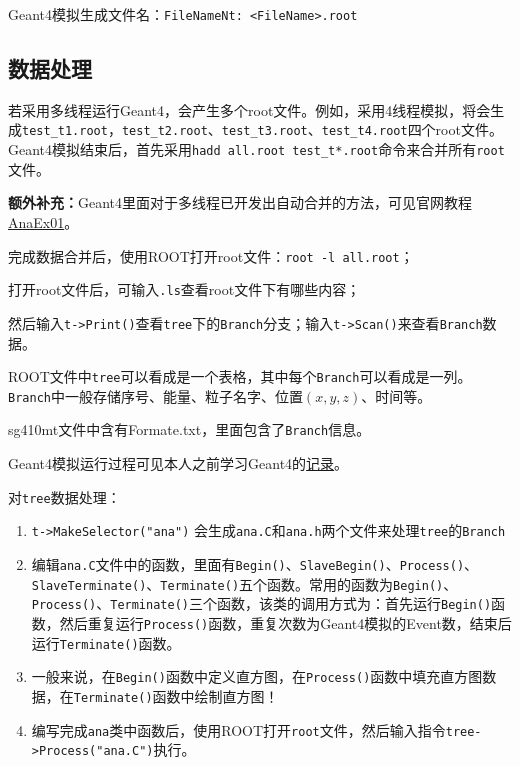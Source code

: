 \documentclass{article}
\begin{document}
Geant4模拟生成文件名：\texttt{FileNameNt: <FileName>.root}

\subsection{数据处理}
若采用多线程运行Geant4，会产生多个root文件。例如，采用4线程模拟，将会生成\texttt{test\_t1.root}，\texttt{test\_t2.root}、\texttt{test\_t3.root}、\texttt{test\_t4.root}四个root文件。Geant4模拟结束后，首先采用\texttt{hadd all.root test\_t*.root}命令来合并所有\texttt{root}文件。

\textbf{额外补充：}Geant4里面对于多线程已开发出自动合并的方法，可见官网教程\href{https://github.com/Geant4/geant4/blob/3dfcdb544e19888c7a5979720ae09596207436f2/examples/extended/analysis/AnaEx01/src/HistoManager.cc#L60}{AnaEx01}。

完成数据合并后，使用ROOT打开root文件：\texttt{root -l all.root}；

打开root文件后，可输入\texttt{.ls}查看root文件下有哪些内容；

然后输入\texttt{t->Print()}查看\texttt{tree}下的\texttt{Branch}分支；输入\texttt{t->Scan()}来查看\texttt{Branch}数据。

ROOT文件中\texttt{tree}可以看成是一个表格，其中每个\texttt{Branch}可以看成是一列。\texttt{Branch}中一般存储序号、能量、粒子名字、位置$ (x, y, z) $、时间等。

sg410mt文件中含有Formate.txt，里面包含了\texttt{Branch}信息。

Geant4模拟运行过程可见本人之前学习Geant4的\href{https://blog.csdn.net/sinat_33249803/article/details/116067709?spm=1001.2014.3001.5501}{记录}。


对\texttt{tree}数据处理：
\begin{enumerate}
    \item \texttt{t->MakeSelector("ana")} 会生成\texttt{ana.C}和\texttt{ana.h}两个文件来处理\texttt{tree}的\texttt{Branch}
    \item 编辑\texttt{ana.C}文件中的函数，里面有\texttt{Begin()}、\texttt{SlaveBegin()}、\texttt{Process()}、\texttt{SlaveTerminate()}、\texttt{Terminate()}五个函数。常用的函数为\texttt{Begin()}、\texttt{Process()}、\texttt{Terminate()}三个函数，该类的调用方式为：首先运行\texttt{Begin()}函数，然后重复运行\texttt{Process()}函数，重复次数为Geant4模拟的Event数，结束后运行\texttt{Terminate()}函数。
    \item 一般来说，在\texttt{Begin()}函数中定义直方图，在\texttt{Process()}函数中填充直方图数据，在\texttt{Terminate()}函数中绘制直方图！
    \item 编写完成\texttt{ana}类中函数后，使用ROOT打开\texttt{root}文件，然后输入指令\texttt{tree->Process("ana.C")}执行。
\end{enumerate}
\end{document}
